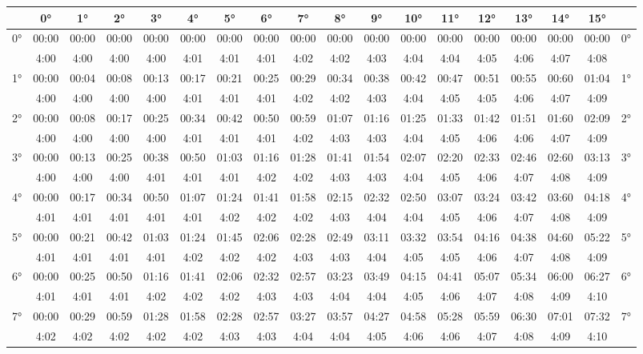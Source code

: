 \begin{scriptsize}\begin{tabular}{c || c | c | c | c | c | c | c | c | c | c | c | c | c | c | c | c || c}
		\space &0°&1°&2°&3°&4°&5°&6°&7°&8°&9°&10°&11°&12°&13°&14°&15°\\\hline\hline
		\multirow{2}{*}{0°}&00:00&00:00&00:00&00:00&00:00&00:00&00:00&00:00&00:00&00:00&00:00&00:00&00:00&00:00&00:00&00:00&\multirow{2}{*}{0°}\\ \space&4:00&4:00&4:00&4:00&4:01&4:01&4:01&4:02&4:02&4:03&4:04&4:04&4:05&4:06&4:07&4:08&\space\\\hline
		\multirow{2}{*}{1°}&00:00&00:04&00:08&00:13&00:17&00:21&00:25&00:29&00:34&00:38&00:42&00:47&00:51&00:55&00:60&01:04&\multirow{2}{*}{1°}\\ \space&4:00&4:00&4:00&4:00&4:01&4:01&4:01&4:02&4:02&4:03&4:04&4:05&4:05&4:06&4:07&4:09&\space\\\hline
		\multirow{2}{*}{2°}&00:00&00:08&00:17&00:25&00:34&00:42&00:50&00:59&01:07&01:16&01:25&01:33&01:42&01:51&01:60&02:09&\multirow{2}{*}{2°}\\ \space&4:00&4:00&4:00&4:00&4:01&4:01&4:01&4:02&4:03&4:03&4:04&4:05&4:06&4:06&4:07&4:09&\space\\\hline
		\multirow{2}{*}{3°}&00:00&00:13&00:25&00:38&00:50&01:03&01:16&01:28&01:41&01:54&02:07&02:20&02:33&02:46&02:60&03:13&\multirow{2}{*}{3°}\\ \space&4:00&4:00&4:00&4:01&4:01&4:01&4:02&4:02&4:03&4:03&4:04&4:05&4:06&4:07&4:08&4:09&\space\\\hline
		\multirow{2}{*}{4°}&00:00&00:17&00:34&00:50&01:07&01:24&01:41&01:58&02:15&02:32&02:50&03:07&03:24&03:42&03:60&04:18&\multirow{2}{*}{4°}\\ \space&4:01&4:01&4:01&4:01&4:01&4:02&4:02&4:02&4:03&4:04&4:04&4:05&4:06&4:07&4:08&4:09&\space\\\hline
		\multirow{2}{*}{5°}&00:00&00:21&00:42&01:03&01:24&01:45&02:06&02:28&02:49&03:11&03:32&03:54&04:16&04:38&04:60&05:22&\multirow{2}{*}{5°}\\ \space&4:01&4:01&4:01&4:01&4:02&4:02&4:02&4:03&4:03&4:04&4:05&4:05&4:06&4:07&4:08&4:09&\space\\\hline
		\multirow{2}{*}{6°}&00:00&00:25&00:50&01:16&01:41&02:06&02:32&02:57&03:23&03:49&04:15&04:41&05:07&05:34&06:00&06:27&\multirow{2}{*}{6°}\\ \space&4:01&4:01&4:01&4:02&4:02&4:02&4:03&4:03&4:04&4:04&4:05&4:06&4:07&4:08&4:09&4:10&\space\\\hline
		\multirow{2}{*}{7°}&00:00&00:29&00:59&01:28&01:58&02:28&02:57&03:27&03:57&04:27&04:58&05:28&05:59&06:30&07:01&07:32&\multirow{2}{*}{7°}\\ \space&4:02&4:02&4:02&4:02&4:02&4:03&4:03&4:04&4:04&4:05&4:06&4:06&4:07&4:08&4:09&4:10&\space\\\hline

\end{tabular}
\end{scriptsize}
